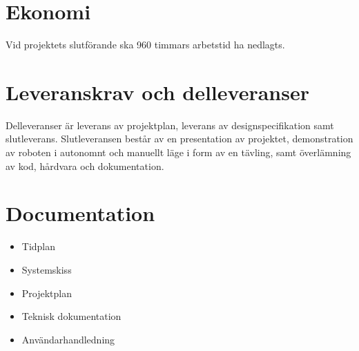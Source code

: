 \documentclass[a4paper,titlepage,12pt]{article}
\begin{document}
	\section{Ekonomi}
	Vid projektets slutförande ska 960 timmars arbetstid ha nedlagts.

	\section{Leveranskrav och delleveranser}
	Delleveranser är leverans av projektplan, leverans av designspecifikation 
	samt slutleverans. Slutleveransen består av en presentation av projektet, 
	demonstration av roboten i autonomnt och manuellt läge i form av en tävling,
	samt överlämning av kod, hårdvara och dokumentation.
	
	\section{Documentation}
    \begin{itemize}
		\item Tidplan 
		\item Systemskiss 
		\item Projektplan
		\item Teknisk dokumentation 
		\item Användarhandledning 
    \end{itemize}
\end{document}

